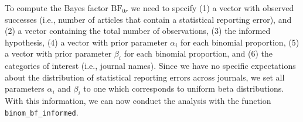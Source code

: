 \documentclass[
  english,
  man,floatsintext]{apa6}
\newenvironment{Shaded}{\begin{snugshade}}{\end{snugshade}}
\newcommand{\CommentTok}[1]{\textcolor[rgb]{0.56,0.35,0.01}{\textit{#1}}}
\newcommand{\DataTypeTok}[1]{\textcolor[rgb]{0.13,0.29,0.53}{#1}}
\newcommand{\DecValTok}[1]{\textcolor[rgb]{0.00,0.00,0.81}{#1}}
\newcommand{\KeywordTok}[1]{\textcolor[rgb]{0.13,0.29,0.53}{\textbf{#1}}}
\newcommand{\NormalTok}[1]{#1}
\newcommand{\OperatorTok}[1]{\textcolor[rgb]{0.81,0.36,0.00}{\textbf{#1}}}
\newcommand{\StringTok}[1]{\textcolor[rgb]{0.31,0.60,0.02}{#1}}
\begin{document}
To compute the Bayes factor \(\text{BF}_{0r}\) we need to specify (1) a vector with observed successes (i.e., number of articles that contain a statistical reporting error), and (2) a vector containing the total number of observations, (3) the informed hypothesis, (4) a vector with prior parameter \(\alpha_i\) for each binomial proportion, (5) a vector with prior parameter \(\beta_i\) for each binomial proportion, and (6) the categories of interest (i.e., journal names). Since we have no specific expectations about the distribution of statistical reporting errors across journals, we set all parameters \(\alpha_i\) and \(\beta_i\) to one which corresponds to uniform beta distributions. With this information, we can now conduct the analysis with the function \texttt{binom\_bf\_informed}.

\begin{Shaded}
\end{Shaded}
\end{document}

